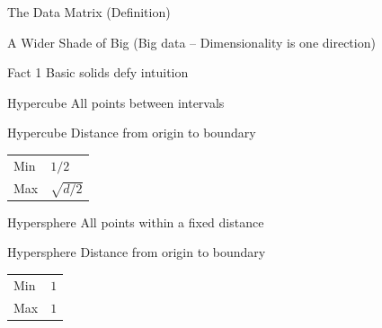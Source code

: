 \documentclass[14pt]{beamer}
\begin{document}

\begin{frame}{The Data Matrix}
  (Definition)
\end{frame}

\begin{frame}{A Wider Shade of Big}
  (Big data -- Dimensionality is one direction)
\end{frame}


\begin{frame}{Fact 1}
  Basic solids defy intuition
\end{frame}

\begin{frame}{Hypercube}
  All points between intervals
\end{frame}

\begin{frame}{Hypercube}
  Distance from origin to boundary

  \begin{tabular}{@{}ll@{}}
    Min & $1/2$ \\
    Max & $\sqrt{d/2}$
  \end{tabular}
\end{frame}

\begin{frame}{Hypersphere}
  All points within a fixed distance
\end{frame}

\begin{frame}{Hypersphere}
  Distance from origin to boundary

  \begin{tabular}{@{}ll@{}}
    Min & $1$ \\
    Max & $1$
  \end{tabular}
\end{frame}
\end{document}
